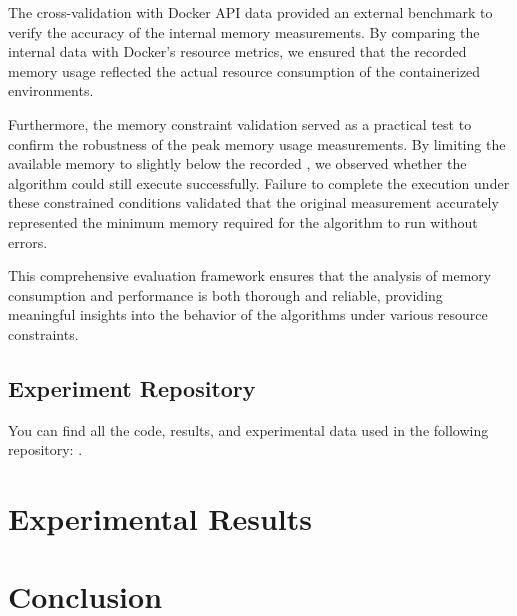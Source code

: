 The cross-validation with Docker \ac{API} data provided an external benchmark to verify the accuracy of the internal memory measurements.
By comparing the internal data with Docker's resource metrics, we ensured that the recorded memory usage reflected the actual resource consumption of the containerized environments.

Furthermore, the memory constraint validation served as a practical test to confirm the robustness of the peak memory usage measurements.
By limiting the available memory to slightly below the recorded \Mpeak, we observed whether the algorithm could still execute successfully.
Failure to complete the execution under these constrained conditions validated that the original \Mpeak measurement accurately represented the minimum memory required for the algorithm to run without errors.

This comprehensive evaluation framework ensures that the analysis of memory consumption and performance is both thorough and reliable, providing meaningful insights into the behavior of the algorithms under various resource constraints.

\subsection{Experiment Repository}
\label{subsec:mmc-experiment-repository}

You can find all the code, results, and experimental data used in the following repository: .


\section{Experimental Results}
\label{sec:mmc-results}



\section{Conclusion}
\label{sec:mmc-conclusion}

